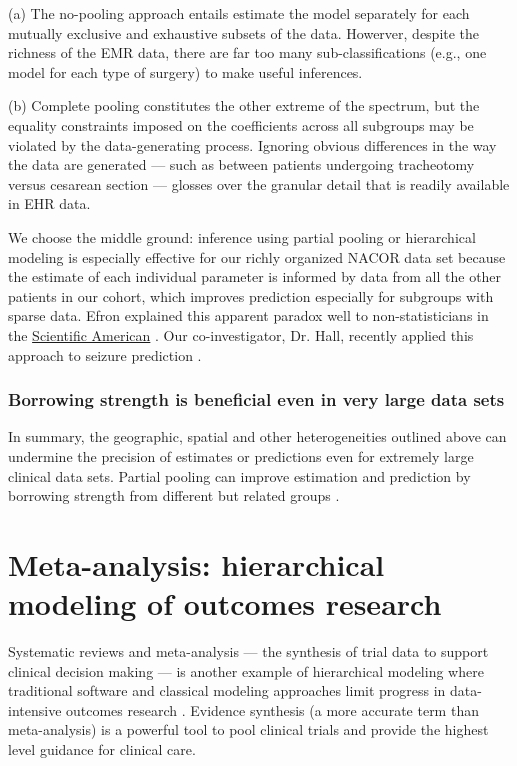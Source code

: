 \documentclass[11pt,notitlepage]{article}
\begin{document}
(a) The no-pooling approach entails estimate the model separately for each mutually exclusive and
exhaustive subsets of the data. Howerver, despite the richness of the EMR data, there are far too many 
sub-classifications (e.g., one model for each type of surgery) to make useful inferences.

(b) Complete pooling constitutes the other extreme of the spectrum, but the equality constraints 
imposed on the coefficients across all subgroups may be violated by the data-generating process. 
Ignoring obvious differences in the way the data are generated --- such 
as between patients undergoing tracheotomy versus cesarean section --- glosses
over the granular detail that is readily available in EHR data.

We choose the middle ground: inference using partial pooling or hierarchical modeling is especially effective 
for our richly organized NACOR data set because the estimate of each individual parameter is informed by data from 
all the other patients in our cohort, which improves prediction especially for subgroups with sparse data. \cite{Gelman2009} 
Efron explained this apparent paradox well to non-statisticians in the 
\href{http://www.nature.com/scientificamerican/journal/v236/n5/pdf/
scientificamerican0577-119.pdf}{Scientific American}
\cite{Stein_paradox_Scientific_American}. 
Our co-investigator, Dr. Hall, recently applied this approach to seizure prediction \cite{Hall2009a}.

\subsubsection*{Borrowing strength is beneficial even in very large data sets}
In summary, the geographic, spatial and other heterogeneities outlined above  
can undermine the precision of estimates or predictions even for 
extremely large clinical data sets. Partial pooling can improve estimation and prediction
by borrowing strength from different but related groups
\cite{Tukey1963borrowing,Jones1986collected}. 

\section*{Meta-analysis: hierarchical modeling of outcomes research}
Systematic reviews and meta-analysis \cite{Sackett1996} --- the synthesis of trial data 
to support clinical decision making --- is another example of hierarchical modeling where traditional software and 
classical modeling approaches limit progress in data-intensive outcomes research \cite{Andreae2015}.  
Evidence synthesis (a more accurate term than meta-analysis) is a powerful tool 
to pool clinical trials and provide the highest level guidance for clinical care\cite{Ashby2000,Cook1997}. 
\end{document}
